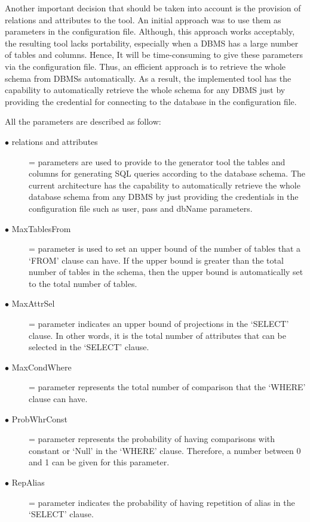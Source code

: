 Another important decision that should be taken into account is the provision of relations and attributes to the tool. An initial approach was to use them as parameters in the configuration file. Although, this approach works acceptably, the resulting tool lacks portability, especially when a DBMS has a large number of tables and columns. Hence, It will be time-consuming to give these parameters via the configuration file. Thus, an efficient approach is to retrieve the whole schema from DBMSs automatically. As a result, the implemented tool has the capability to automatically retrieve the whole schema for any DBMS just by providing the credential for connecting to the database in the configuration file.    

\hfill\newline
All the parameters are described as follow:
\begin{description}
   \item[$\bullet$ relations and attributes] =  parameters are used to provide to the generator tool the tables and columns for generating SQL queries according to the database schema. The current architecture has the capability to automatically retrieve the whole database schema from any DBMS by just providing the credentials in the configuration file such as user, pass and dbName parameters. 

\item[$\bullet$ MaxTablesFrom] = parameter is used to set an upper bound of the number of tables that a ‘FROM’ clause can have. If the upper bound is greater than the total number of tables in the schema, then the upper bound is automatically set to the total number of tables. 

\item[$\bullet$ MaxAttrSel] =  parameter indicates an upper bound of projections in the ‘SELECT’ clause. In other words, it is the total number of attributes that can be selected in the ‘SELECT’ clause.
 
\item[$\bullet$ MaxCondWhere]= parameter represents the total number of comparison that the ‘WHERE’ clause can have. 
 
\item[$\bullet$ ProbWhrConst] = parameter represents the probability of having comparisons with constant or ‘Null’ in the ‘WHERE’ clause. Therefore, a number between 0 and 1 can be given for this parameter.  

\item[$\bullet$ RepAlias]= parameter indicates the probability of having repetition of alias in the ‘SELECT’ clause. 


\end{description}
